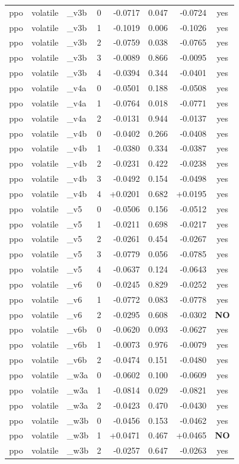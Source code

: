 \documentclass[11pt]{article}
\begin{document}
\begin{center}
\begin{longtable}{lllrrrrc}
ppo & volatile & \_v3b & 0 & -0.0717 & 0.047 & -0.0724 & yes \\
ppo & volatile & \_v3b & 1 & -0.1019 & 0.006 & -0.1026 & yes \\
ppo & volatile & \_v3b & 2 & -0.0759 & 0.038 & -0.0765 & yes \\
ppo & volatile & \_v3b & 3 & -0.0089 & 0.866 & -0.0095 & yes \\
ppo & volatile & \_v3b & 4 & -0.0394 & 0.344 & -0.0401 & yes \\
ppo & volatile & \_v4a & 0 & -0.0501 & 0.188 & -0.0508 & yes \\
ppo & volatile & \_v4a & 1 & -0.0764 & 0.018 & -0.0771 & yes \\
ppo & volatile & \_v4a & 2 & -0.0131 & 0.944 & -0.0137 & yes \\
ppo & volatile & \_v4b & 0 & -0.0402 & 0.266 & -0.0408 & yes \\
ppo & volatile & \_v4b & 1 & -0.0380 & 0.334 & -0.0387 & yes \\
ppo & volatile & \_v4b & 2 & -0.0231 & 0.422 & -0.0238 & yes \\
ppo & volatile & \_v4b & 3 & -0.0492 & 0.154 & -0.0498 & yes \\
ppo & volatile & \_v4b & 4 & +0.0201 & 0.682 & +0.0195 & yes \\
ppo & volatile & \_v5 & 0 & -0.0506 & 0.156 & -0.0512 & yes \\
ppo & volatile & \_v5 & 1 & -0.0211 & 0.698 & -0.0217 & yes \\
ppo & volatile & \_v5 & 2 & -0.0261 & 0.454 & -0.0267 & yes \\
ppo & volatile & \_v5 & 3 & -0.0779 & 0.056 & -0.0785 & yes \\
ppo & volatile & \_v5 & 4 & -0.0637 & 0.124 & -0.0643 & yes \\
ppo & volatile & \_v6 & 0 & -0.0245 & 0.829 & -0.0252 & yes \\
ppo & volatile & \_v6 & 1 & -0.0772 & 0.083 & -0.0778 & yes \\
ppo & volatile & \_v6 & 2 & -0.0295 & 0.608 & -0.0302 & \textbf{NO} \\
ppo & volatile & \_v6b & 0 & -0.0620 & 0.093 & -0.0627 & yes \\
ppo & volatile & \_v6b & 1 & -0.0073 & 0.976 & -0.0079 & yes \\
ppo & volatile & \_v6b & 2 & -0.0474 & 0.151 & -0.0480 & yes \\
ppo & volatile & \_w3a & 0 & -0.0602 & 0.100 & -0.0609 & yes \\
ppo & volatile & \_w3a & 1 & -0.0814 & 0.029 & -0.0821 & yes \\
ppo & volatile & \_w3a & 2 & -0.0423 & 0.470 & -0.0430 & yes \\
ppo & volatile & \_w3b & 0 & -0.0456 & 0.153 & -0.0462 & yes \\
ppo & volatile & \_w3b & 1 & +0.0471 & 0.467 & +0.0465 & \textbf{NO} \\
ppo & volatile & \_w3b & 2 & -0.0257 & 0.647 & -0.0263 & yes \\
\bottomrule
\end{longtable}\end{center}
\clearpage
\end{document}
